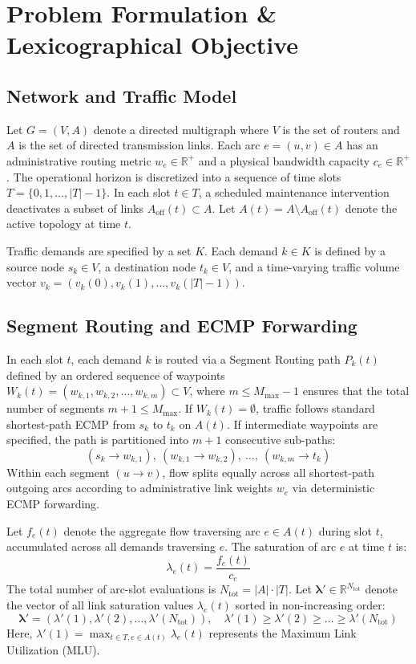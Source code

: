 \documentclass[10pt,journal,compsoc]{IEEEtran}
\begin{document}
\section{Problem Formulation \& Lexicographical Objective}

\subsection{Network and Traffic Model}
Let $G = (V, A)$ denote a directed multigraph where $V$ is the set of routers and $A$ is the set of directed transmission links. Each arc $e = (u, v) \in A$ has an administrative routing metric $w_e \in \mathbb{R}^+$ and a physical bandwidth capacity $c_e \in \mathbb{R}^+$. The operational horizon is discretized into a sequence of time slots $T = \{0, 1, \dots, |T|-1\}$. In each slot $t \in T$, a scheduled maintenance intervention deactivates a subset of links $A_{\text{off}}(t) \subset A$. Let $A(t) = A \setminus A_{\text{off}}(t)$ denote the active topology at time $t$.

Traffic demands are specified by a set $K$. Each demand $k \in K$ is defined by a source node $s_k \in V$, a destination node $t_k \in V$, and a time-varying traffic volume vector $v_k = (v_k(0), v_k(1), \dots, v_k(|T|-1))$.

\subsection{Segment Routing and ECMP Forwarding}
In each slot $t$, each demand $k$ is routed via a Segment Routing path $P_k(t)$ defined by an ordered sequence of waypoints $W_k(t) = (w_{k,1}, w_{k,2}, \dots, w_{k,m}) \subset V$, where $m \le M_{\max} - 1$ ensures that the total number of segments $m + 1 \le M_{\max}$. If $W_k(t) = \emptyset$, traffic follows standard shortest-path ECMP from $s_k$ to $t_k$ on $A(t)$. If intermediate waypoints are specified, the path is partitioned into $m+1$ consecutive sub-paths:
\begin{equation}
(s_k \to w_{k,1}),\ (w_{k,1} \to w_{k,2}),\ \dots,\ (w_{k,m} \to t_k)
\end{equation}
Within each segment $(u \to v)$, flow splits equally across all shortest-path outgoing arcs according to administrative link weights $w_e$ via deterministic ECMP forwarding.

Let $f_e(t)$ denote the aggregate flow traversing arc $e \in A(t)$ during slot $t$, accumulated across all demands traversing $e$. The saturation of arc $e$ at time $t$ is:
\begin{equation}
\lambda_e(t) = \frac{f_e(t)}{c_e}
\end{equation}
The total number of arc-slot evaluations is $N_{\text{tot}} = |A| \cdot |T|$. Let $\boldsymbol{\lambda}' \in \mathbb{R}^{N_{\text{tot}}}$ denote the vector of all link saturation values $\lambda_e(t)$ sorted in non-increasing order:
\begin{equation}
\boldsymbol{\lambda}' = (\lambda'(1), \lambda'(2), \dots, \lambda'(N_{\text{tot}})), \quad \lambda'(1) \ge \lambda'(2) \ge \dots \ge \lambda'(N_{\text{tot}})
\end{equation}
Here, $\lambda'(1) = \max_{t \in T, e \in A(t)} \lambda_e(t)$ represents the Maximum Link Utilization (MLU).
\end{document}
